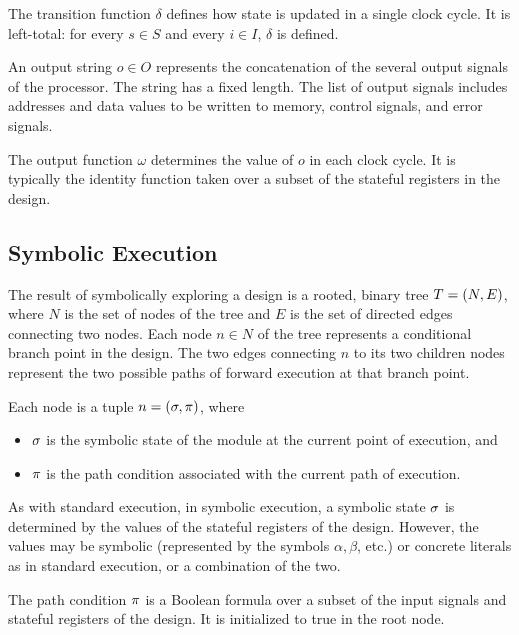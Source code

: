 The transition function $\delta$ defines how state is updated in a single clock
cycle. It is left-total: for every $s \in S$ and every $i \in I$, $\delta$ is defined.

An output string $o \in O$ represents the concatenation of the several output
signals of the processor. The string has a fixed length. The list of output
signals includes addresses and data values to be written to memory, control
signals, and error signals.

The output function $\omega$ determines the value of $o$ in each clock cycle. It
is typically the identity function taken over a subset of the stateful registers
in the design.

\subsection{Symbolic Execution}


The result of symbolically exploring a design is a rooted, binary tree $T = (N, E)$, where
$N$ is the set of nodes of the tree and $E$ is the set of directed edges connecting
two nodes. Each node $n \in N$ of the tree represents a conditional branch point in the
design. The two edges connecting $n$ to its two children nodes represent the two
possible paths of forward execution at that branch point.

Each node is a tuple $n = (\sigma, \pi)$, where
\begin{itemize}
\item $\sigma$ is the symbolic state of the module at the current point of
  execution, and
\item $\pi$ is the path condition associated with the current path of
  execution.
\end{itemize}


As with standard execution, in symbolic execution, a symbolic state $\sigma$
is determined by the values of the stateful registers of the design. However,
the values may be symbolic (represented by the symbols $\alpha, \beta$, etc.) or
concrete literals as in standard execution, or a combination of the two.

The path condition $\pi$ is a Boolean formula over a subset of the input signals and
stateful registers of the design. It is initialized to true in the root node. 


